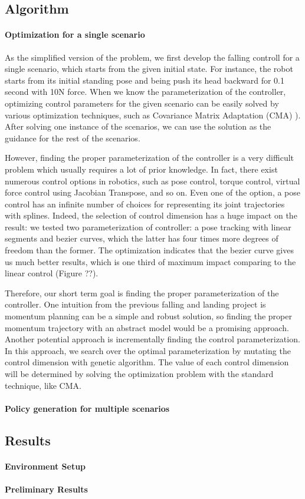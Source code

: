 \subsection{Algorithm}

\paragraph{Optimization for a single scenario}

As the simplified version of the problem, we first develop the falling
controll for a single scenario, which starts from the given initial 
state.
For instance, the robot starts from its initial standing pose and 
being push its head backward for 0.1 second with 10N force.
When we know the parameterization of the controller, optimizing
control parameters for the given scenario can be easily solved
by various optimization techniques, such as 
Covariance Matrix Adaptation (CMA) \cite{Hansen:2004:CMA}).
After solving one instance of the scenarios, we can use the solution
as the guidance for the rest of the scenarios.

However, finding the proper parameterization of the controller
is a very difficult problem which usually requires a lot of prior knowledge.
In fact, there exist numerous control options in robotics, such as
pose control, torque control, virtual force control using Jacobian
Transpose, and so on.
Even one of the option, a pose control has an infinite number of choices for
representing its joint trajectories with splines.
Indeed, the selection of control dimension has a huge impact on the
result: we tested two parameterization of controller: a pose tracking 
with linear segments and bezier curves, which the latter has four times
more degrees of freedom than the former.
The optimization indicates that the bezier curve gives us 
much better results, which is one third of maximum impact
comparing to the linear control (Figure ??).

Therefore, our short term goal is finding the proper parameterization
of the controller.
One intuition from the previous falling and landing project is
momentum planning can be a simple and robust solution, so finding the 
proper momentum trajectory with an abstract model would be 
a promising approach.
Another potential approach is incrementally finding the control 
parameterization. 
In this approach, we search over the optimal parameterization by 
mutating the control dimension with genetic algorithm.
The value of each control dimension will be determined by solving
the optimization problem with the standard technique, like CMA.


\paragraph{Policy generation for multiple scenarios}

\subsection{Results}

\paragraph{Environment Setup}

\paragraph{Preliminary Results}


